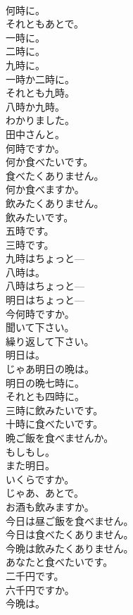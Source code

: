 \documentclass[8pt]{extreport}
\begin{document}
\begin{CJK}{UTF8}{min}
\\	何時に。	
\\	それともあとで。	
\\	一時に。	
\\	二時に。	
\\	九時に。	
\\	一時か二時に。	
\\	それとも九時。	
\\	八時か九時。	
\\	わかりました。	
\\	田中さんと。	
\\	何時ですか。	
\\	何か食べたいです。	
\\	食べたくありません。	
\\	何か食べますか。	
\\	飲みたくありません。	
\\	飲みたいです。	
\\	五時です。	
\\	三時です。	
\\	九時はちょっと---	
\\	八時は。	
\\	八時はちょっと---	
\\	明日はちょっと---	
\\	今何時ですか。	
\\	聞いて下さい。	
\\	繰り返して下さい。	
\\	明日は。	
\\	じゃあ明日の晩は。	
\\	明日の晩七時に。	
\\	それとも四時に。	
\\	三時に飲みたいです。	
\\	十時に食べたいです。	
\\	晩ご飯を食べませんか。	
\\	もしもし。	
\\	また明日。	
\\	いくらですか。	
\\	じゃあ、あとで。	
\\	お酒も飲みますか。	
\\	今日は昼ご飯を食べません。	
\\	今日は食べたくありません。	
\\	今晩は飲みたくありません。	
\\	あなたと食べたいです。	
\\	二千円です。	
\\	六千円ですか。	
\\	今晩は。	

\end{CJK}
\end{document}
